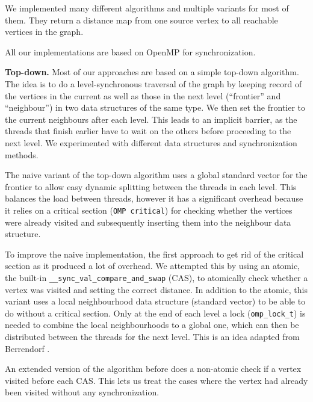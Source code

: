 \documentclass[letterpaper]{article}
\newcommand{\mypar}[1]{{\bf #1.}} %
\begin{document}
		We implemented many different algorithms and multiple variants for most of them. They return a distance map from one source vertex to all reachable vertices in the graph.
		
		All our implementations are based on OpenMP for synchronization.
		
		
		\mypar{Top-down}
		Most of our approaches are based on a simple top-down algorithm. 
		The idea is to do a level-synchronous traversal of the graph by keeping record of the vertices in the current as well as those in the next level (``frontier'' and ``neighbour'') in two data structures of the same type. 
		We then set the frontier to the current neighbours after each level. 
		This leads to an implicit barrier, as the threads that finish earlier have to wait on the others before proceeding to the next level.
		We experimented with different data structures and synchronization methods.
		
		The naive variant of the top-down algorithm uses a global standard vector for the frontier to allow easy dynamic splitting between the threads in each level. 
		This balances the load between threads, however it has a significant overhead because it relies on a critical section (\verb+OMP critical+) for checking whether the vertices were already visited and subsequently inserting them into the neighbour data structure.
		
		To improve the naive implementation, the first approach to get rid of the critical section as it produced a lot of overhead. 
		We attempted this by using an atomic, the built-in \verb+__sync_val_compare_and_swap+ (CAS), to atomically check whether a vertex was visited and setting the correct distance. 
		In addition to the atomic, this variant uses a local neighbourhood data structure (standard vector) to be able to do without a critical section. 
		Only at the end of each level a lock (\verb+omp_lock_t+) is needed to combine the local neighbourhoods to a global one, which can then be distributed between the threads for the next level. 
		This is an idea adapted from Berrendorf \cite{Berrendorf:14}.
		
		An extended version of the algorithm before does a non-atomic check if a vertex visited before each CAS. 
		This lets us treat the cases where the vertex had already been visited without any synchronization.
		
\end{document}
